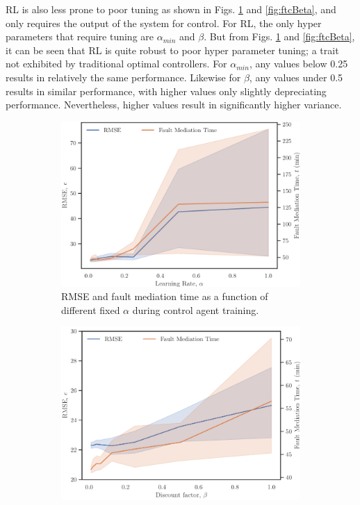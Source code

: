 RL is also less prone to poor tuning as shown in Figs. \ref{fig:ftcAlpha} and \ref{fig:ftcBeta}, and only requires the output of the system for control.  For RL, the only hyper parameters that require tuning are $\alpha_{min}$ and $\beta$.  But from Figs. \ref{fig:ftcAlpha} and \ref{fig:ftcBeta}, it can be seen that RL is quite robust to poor hyper parameter tuning; a trait not exhibited by traditional optimal controllers. For $\alpha_{min}$, any values below 0.25 results in relatively the same performance.  Likewise for $\beta$, any values under 0.5 results in similar performance, with higher values only slightly depreciating performance.  Nevertheless, higher values result in significantly higher variance.

\begin{figure}[h]
    \begin{center}
    \begin{subfigure}[b]{0.49\textwidth}
        \includegraphics[width=\textwidth]{images/ftc/ftcAlpha.pdf}
        \caption{{\scriptsize RMSE and fault mediation time as a function of different fixed $\alpha$ during control agent training.}}
        \label{fig:ftcAlpha}
    \end{subfigure}
    \hfill
    \begin{subfigure}[b]{0.49\textwidth}
        \includegraphics[width=\textwidth]{images/ftc/ftcBeta.pdf}

\end{subfigure}
\end{center}
\end{figure}
